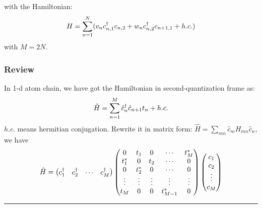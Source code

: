 \documentclass[letterpaper,10pt,english]{sphinxmanual}
\begin{document}
with the Hamiltonian:
\begin{gather}
\begin{split}H=\sum_{n=1}^N(v_n c_{n,1}^\dagger c_{n,2}+w_nc_{n,2}^\dagger c_{n+1,1}+h.c.)\end{split}\notag
\end{gather}
with \(M=2N\).


\subsubsection{Review}
\label{TI/Lecture notes/1:review}
In 1-d atom chain, we have got the Hamiltonian in second-quantization
frame as:
\begin{gather}
\begin{split}\hat{H}=\sum_{n=1}^M \hat{c}_n^\dagger \hat{c}_{n+1}t_n+h.c.\end{split}\notag
\end{gather}
\(h.c.\) means hermitian conjugation. Rewrite it in matrix form:
\(\hat{H}=\sum\limits_{mn}\hat{c}_m {H}_{mn}\hat{c}_n\), we have
\begin{gather}
\begin{split}\hat{H}=\begin{pmatrix}c_1^\dagger&c_2^\dagger&\cdots&c_M^\dagger \end{pmatrix}\begin{pmatrix} 0 & t_1 &0 & \cdots&t_M^*\\
t_1^* &0&t_2&\cdots&0\\
0&t_2^*&0&\cdots&0\\
\vdots&\vdots&\vdots&\vdots&\vdots\\
t_M&0&0&t_{M-1}^*&0
\end{pmatrix}\begin{pmatrix}c_1\\c_2\\\vdots\\c_M\end{pmatrix}\end{split}\notag
\end{gather}

\bigskip\hrule{}\bigskip
\end{document}
